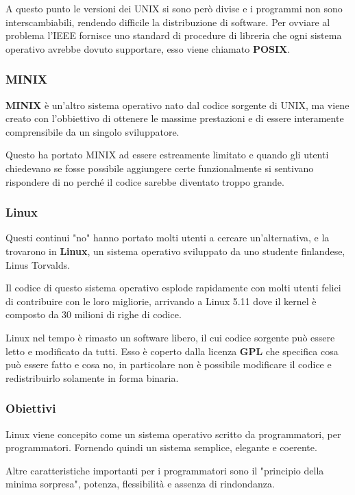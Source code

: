 \spacer
A questo punto le versioni dei UNIX si sono però divise e i programmi non sono interscambiabili, rendendo difficile la distribuzione di software.
Per ovviare al problema l'IEEE fornisce uno standard di procedure di libreria che ogni sistema operativo avrebbe dovuto supportare, esso viene chiamato \textbf{POSIX}.

\subsubsection{MINIX}
\textbf{MINIX} è un'altro sistema operativo nato dal codice sorgente di UNIX, ma viene creato con l'obbiettivo di ottenere le massime prestazioni e di essere interamente comprensibile da un singolo sviluppatore.

\spacer
Questo ha portato MINIX ad essere estreamente limitato e quando gli utenti chiedevano se fosse possibile aggiungere certe funzionalmente si sentivano rispondere di no perché il codice sarebbe diventato troppo grande.

\subsubsection{Linux}
Questi continui "no" hanno portato molti utenti a cercare un'alternativa, e la trovarono in \textbf{Linux}, un sistema operativo sviluppato da uno studente finlandese, Linus Torvalds.

Il codice di questo sistema operativo esplode rapidamente con molti utenti felici di contribuire con le loro migliorie, arrivando a Linux 5.11 dove il kernel è composto da 30 milioni di righe di codice.

Linux nel tempo è rimasto un software libero, il cui codice sorgente può essere letto e modificato da tutti. Esso è coperto dalla licenza \textbf{GPL} che specifica cosa può essere fatto e cosa no, in particolare non è possibile modificare il codice e redistribuirlo solamente in forma binaria.

\subsubsection{Obiettivi}
Linux viene concepito come un sistema operativo scritto da programmatori, per programmatori. Fornendo quindi un sistema semplice, elegante e coerente.

Altre caratteristiche importanti per i programmatori sono il "principio della minima sorpresa", potenza, flessibilità e assenza di rindondanza.

